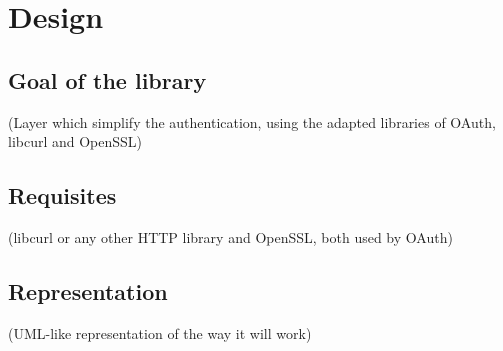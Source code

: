 \chapter{Design}


\section{Goal of the library}

(Layer which simplify the authentication, using the adapted libraries of OAuth, libcurl and OpenSSL)


\section{Requisites}

(libcurl or any other HTTP library and OpenSSL, both used by OAuth)


\section{Representation}

(UML-like representation of the way it will work)


\clearpage

